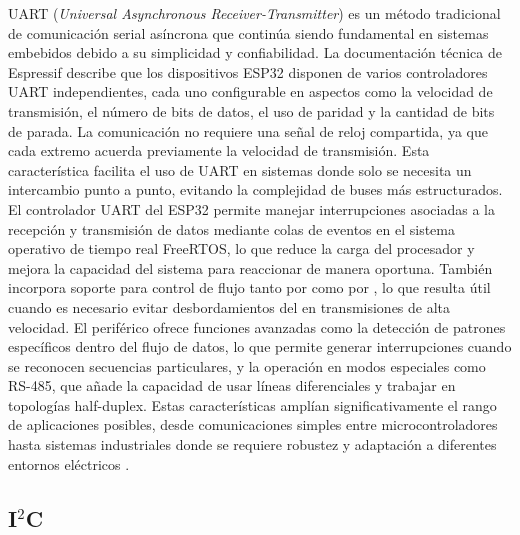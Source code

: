 UART (\textit{Universal Asynchronous Receiver-Transmitter}) es un método tradicional de comunicación serial asíncrona que continúa siendo fundamental en sistemas embebidos debido a su simplicidad y confiabilidad. La documentación técnica de Espressif describe que los dispositivos ESP32 disponen de varios controladores UART independientes, cada uno configurable en aspectos como la velocidad de transmisión, el número de bits de datos, el uso de paridad y la cantidad de bits de parada.
La comunicación no requiere una señal de reloj compartida, ya que cada extremo acuerda previamente la velocidad de transmisión. Esta característica facilita el uso de UART en sistemas donde solo se necesita un intercambio punto a punto, evitando la complejidad de buses más estructurados.
El controlador UART del ESP32 permite manejar interrupciones asociadas a la recepción y transmisión de datos mediante colas de eventos en el sistema operativo de tiempo real FreeRTOS, lo que reduce la carga del procesador y mejora la capacidad del sistema para reaccionar de manera oportuna. También incorpora soporte para control de flujo tanto por  como por , lo que resulta útil cuando es necesario evitar desbordamientos del  en transmisiones de alta velocidad.
El periférico ofrece funciones avanzadas como la detección de patrones específicos dentro del flujo de datos, lo que permite generar interrupciones cuando se reconocen secuencias particulares, y la operación en modos especiales como RS-485, que añade la capacidad de usar líneas diferenciales y trabajar en topologías half-duplex. Estas características amplían significativamente el rango de aplicaciones posibles, desde comunicaciones simples entre microcontroladores hasta sistemas industriales donde se requiere robustez y adaptación a diferentes entornos eléctricos \cite{uartEspressif}.

\subsection{\texorpdfstring{I$^{2}$C}{I2C}}

